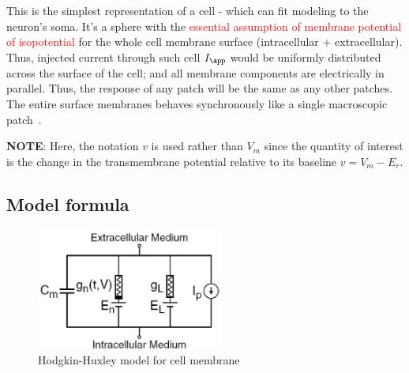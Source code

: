 \begin{framed}
This is the simplest representation of a cell - which can fit modeling to the
neuron's soma. It's a sphere with the \textcolor{red}{essential assumption of
membrane potential of isopotential} for the whole cell membrane surface (intracellular +
extracellular). Thus, injected current through such cell $I_\app $ would be
uniformly distributed across the surface of the cell; and all membrane
components are electrically in parallel. Thus, the response of any patch will be
the same as any other patches. The entire surface membranes behaves
synchronously like a single macroscopic patch~\citep{plonsey2000bqa}.

{\bf NOTE}: Here, the notation $v$ is used rather than $V_m$ since the quantity
of interest is the change in the transmembrane potential relative to its
baseline $v=V_m-E_r$.
\end{framed}


\subsection{Model formula}
\label{sec:LIF-formula}

\begin{figure}[htb]
\centerline{\includegraphics[height=4cm]{./images/Hodgkin-Huxley.eps}}
\caption{Hodgkin-Huxley model for cell membrane}\label{fig:Hodgkin-Huxley}
\end{figure}

